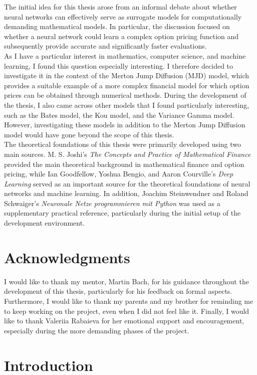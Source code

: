 \documentclass{article}
\begin{document}
	The initial idea for this thesis arose from an informal debate about whether neural networks can effectively serve as surrogate models for computationally demanding mathematical models. In particular, the discussion focused on whether a neural network could learn a complex option pricing function and subsequently provide accurate and significantly faster evaluations.\\As I have a particular interest in mathematics, computer science, and machine learning, I found this question especially interesting. I therefore decided to investigate it in the context of the Merton Jump Diffusion (MJD) model, which provides a suitable example of a more complex financial model for which option prices can be obtained through numerical methods. During the development of the thesis, I also came across other models that I found particularly interesting, such as the Bates model, the Kou model, and the Variance Gamma model. However, investigating these models in addition to the Merton Jump Diffusion model would have gone beyond the scope of this thesis.\\The theoretical foundations of this thesis were primarily developed using two main sources. M. S. Joshi's \textit{The Concepts and Practice of Mathematical Finance} provided the main theoretical background in mathematical finance and option pricing, while Ian Goodfellow, Yoshua Bengio, and Aaron Courville's \textit{Deep Learning} served as an important source for the theoretical foundations of neural networks and machine learning. In addition, Joachim Steinwendner and Roland Schwaiger's \textit{Neuronale Netze programmieren mit Python} was used as a supplementary practical reference, particularly during the initial setup of the development environment.\\
	
	\section{Acknowledgments}
	
	I would like to thank my mentor, Martin Bach, for his guidance throughout the development of this thesis, particularly for his feedback on formal aspects. Furthermore, I would like to thank my parents and my brother for reminding me to keep working on the project, even when I did not feel like it. Finally, I would like to thank Valeriia Rabaieva for her emotional support and encouragement, especially during the more demanding phases of the project.
	
	\section{Introduction}
	
\end{document}

